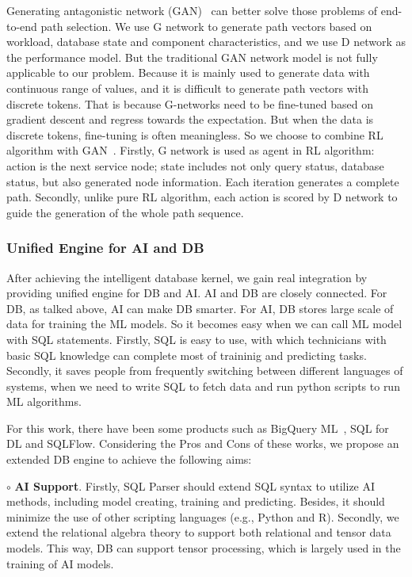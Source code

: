 Generating antagonistic network (GAN)~\cite{DBLP:journals/corr/abs-1902-05687} can better solve those problems of end-to-end path selection. We use G network to generate path vectors based on workload, database state and component characteristics, and we use D network as the performance model. 
But the traditional GAN network model is not fully applicable to our problem. Because it is mainly used to generate data with continuous range of values, and it is difficult to generate path vectors with discrete tokens. That is because G-networks need to be fine-tuned based on gradient descent and regress towards the expectation. But when the data is discrete tokens, fine-tuning is often meaningless.
So we choose to combine RL algorithm with GAN~\cite{DBLP:conf/aaai/YuZWY17}. Firstly, G network is used as agent in RL algorithm: action is the next service node; state includes not only query status, database status, but also generated node information. Each iteration generates a complete path. Secondly, unlike pure RL algorithm, each action is scored by D network to guide the generation of the whole path sequence.

\subsubsection{Unified Engine for AI and DB}
\label{subsubsec: engine}
After achieving the intelligent database kernel, we gain real integration by providing unified engine for DB and AI. AI and DB are closely connected. For DB, as talked above, AI can make DB  smarter. For AI, DB stores large scale of data for training the ML models. 
So it becomes easy when we can call ML model with SQL statements. Firstly, SQL is easy to use, with which technicians with basic SQL knowledge can complete most of traininig and predicting tasks. Secondly, it saves people from frequently switching between different languages of systems, when we need to write SQL to fetch data and run python scripts to run ML algorithms.

For this work, there have been some products such as BigQuery ML~\cite{DBLP:conf/ideas/FernandesB15}, SQL for DL and SQLFlow. Considering the Pros and Cons of these works, we propose an extended DB engine to achieve the following aims:

$\circ$ \textbf{AI Support}. Firstly, SQL Parser should extend SQL syntax to utilize AI methods, including model creating, training and predicting. Besides, it should minimize the use of other scripting languages (e.g., Python and R). Secondly, we extend the relational algebra theory to support both relational and tensor data models. This way, DB can support tensor processing, which is largely used in the training of AI models.


